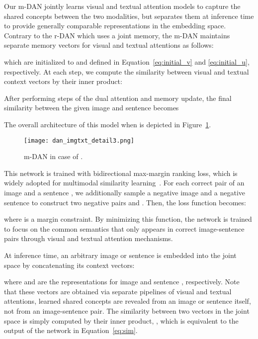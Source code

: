 \documentclass[10pt,twocolumn,letterpaper]{article}
\begin{document}
Our m-DAN jointly learns visual and textual attention models to capture the shared concepts between the two modalities, but separates them at inference time to provide generally comparable representations in the embedding space.
Contrary to the r-DAN which uses a joint memory, the m-DAN maintains separate memory vectors for visual and textual attentions as follows:

which are initialized to  and  defined in Equation~\ref{eq:initial_v} and \ref{eq:initial_u}, respectively.
At each step, we compute the similarity  between visual and textual context vectors by their inner product:

After performing  steps of the dual attention and memory update, the final similarity  between the given image and sentence becomes

The overall architecture of this model when  is depicted in Figure~\ref{fig:dan_matching_detail}.

\begin{figure}[t]
\begin{center}
\texttt{[image: dan\_imgtxt\_detail3.png]}
\caption{
m-DAN in case of .
}
\label{fig:dan_matching_detail}
\vspace{-5mm}
\end{center}
\end{figure}

This network is trained with bidirectional max-margin ranking loss, which is widely adopted for multimodal similarity learning~\cite{karpathy2014deep,karpathy2015deep,kiros2015unifying,wang2016learning}.
For each correct pair of an image and a sentence , we additionally sample a negative image  and a negative sentence  to construct two negative pairs  and .
Then, the loss function becomes:

where  is a margin constraint.
By minimizing this function, the network is trained to focus on the common semantics that only appears in correct image-sentence pairs through visual and textual attention mechanisms.

At inference time, an arbitrary image or sentence is embedded into the joint space by concatenating its context vectors:

where  and  are the representations for image  and sentence , respectively.
Note that these vectors are obtained via separate pipelines of visual and textual attentions, \ie learned shared concepts are revealed from an image or sentence itself, not from an image-sentence pair.
The similarity between two vectors in the joint space is simply computed by their inner product, \eg , which is equivalent to the output of the network in Equation~\ref{eq:sim}.
\end{document}
